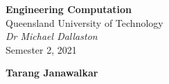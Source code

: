 \documentclass{article}
\date{}
\newcommand{\uniTitle}{Queensland University of Technology}
\newcommand{\className}{Engineering Computation}
\newcommand{\classTime}{Semester 2, 2021}
\newcommand{\classInstructorName}{Dr Michael Dallaston}
\newcommand{\authorName}{Tarang Janawalkar}
\begin{document}
\begin{titlepage}
    \vspace*{\fill}
	\begin{center}
        \LARGE
        \textbf{\className}
        \texorpdfstring{\\}{ }
        \uniTitle
        \texorpdfstring{\\}{ }
        \texorpdfstring{\vspace{0.3in}}{ }
        \normalsize\textit{\classInstructorName}
        \texorpdfstring{\\}{ }
        \classTime
    \end{center}
    \begin{center}
        \textbf{\authorName}
    \end{center}
    \vspace*{\fill}
    \doclicenseThis
    \thispagestyle{empty}
\end{titlepage}
\newpage

\tableofcontents
\newpage
\end{document}

